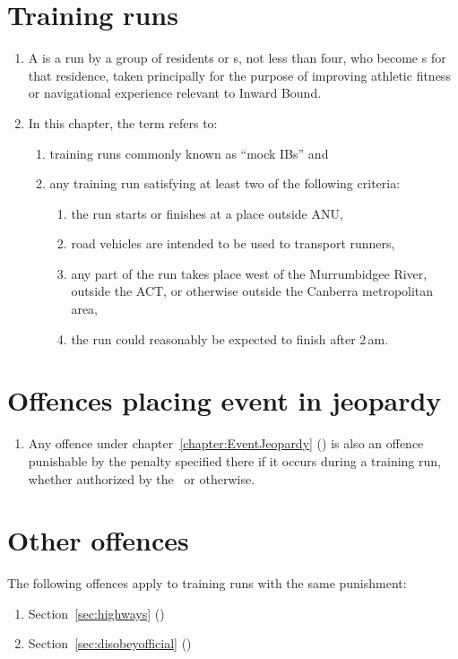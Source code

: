 \documentclass[12pt]{report}
\begin{document}
\section{Training runs}
\begin{enumerate}
  \item[] A  is a run by a group of residents or \exresident s, not less than four, who  become \competitor s for that residence, taken principally for the purpose of improving athletic fitness or navigational experience relevant to Inward Bound.

  \item[] In this chapter, the term  refers to:
   \begin{enumerate}
   \item training runs commonly known as ``mock IBs'' and
   \item any training run satisfying at least two of the following criteria:
  \begin{enumerate}
    \item the run starts or finishes at a place outside ANU,
    \item road vehicles are intended to be used to transport runners,
    \item any part of the run takes place west of the Murrumbidgee River, outside the ACT, or otherwise outside the Canberra metropolitan area,
    \item the run could reasonably be expected to finish after 2\,am.
  \end{enumerate}
  \end{enumerate}
\end{enumerate}
\section{Offences placing event in jeopardy}
\begin{enumerate}
  \item[] Any offence under chapter~\ref{chapter:EventJeopardy} () is also an offence punishable by the penalty specified there if it occurs during a training run, whether authorized by the \Coach\ or otherwise.
\end{enumerate}
\section{Other offences}
\begin{fenumerate}
  \item The following offences apply to training runs with the same punishment:
  \begin{enumerate}
    \item Section~\ref{sec:highways} ()
    \item Section~\ref{sec:disobeyofficial} ()
  \end{enumerate}
\end{fenumerate}
\end{document}
